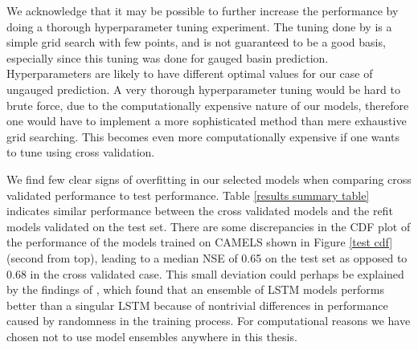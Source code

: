 We acknowledge that it may be possible to further increase the performance by doing 
a thorough hyperparameter tuning experiment. The tuning done by \citet{lstm_second_paper} 
is a simple grid search with few points, and is not guaranteed to be a good basis, 
especially since this tuning was done for gauged basin prediction. Hyperparameters 
are likely to have different optimal values for our case of ungauged prediction. A very thorough 
hyperparameter tuning would be hard to brute force, due to the computationally 
expensive nature of our models, therefore one would have to implement a more sophisticated 
method than mere exhaustive grid searching. This becomes even more computationally 
expensive if one wants to tune using cross validation.

We find few clear signs of overfitting in our selected models when comparing 
cross validated performance to test performance. Table 
\ref{results summary table} indicates 
similar performance between the cross validated models and the refit models 
validated on the test set. There are some discrepancies in the CDF plot of 
the performance of the models trained on CAMELS 
shown in Figure \ref{test cdf} (second from top), leading to a median NSE of 
0.65 on the test set as opposed to $0.68$ in the cross validated case. This small 
deviation could perhaps be explained by the findings of \citet{lstm_second_paper},
 which found that an ensemble of LSTM models performs better than a singular LSTM 
 because of nontrivial differences in performance caused by randomness in the 
 training process. For computational reasons we have chosen not to use model 
 ensembles anywhere in this thesis.

